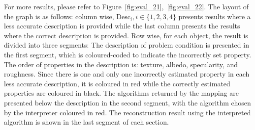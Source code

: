 For more results, please refer to Figure~\ref{fig:eval_21},~\ref{fig:eval_22}. The layout of the graph is as follows: column wise, $\text{Desc}_i, i\in\{1, 2, 3, 4\}$ presents results where a less accurate description is provided while the last column presents the results where the correct description is provided. Row wise, for each object, the result is divided into three segments: The description of problem condition is presented in the first segment, which is coloured-coded to indicate the incorrectly set property. The order of properties in the description is: texture, albedo, specularity, and roughness. Since there is one and only one incorrectly estimated property in each less accurate description, it is coloured in red while the correctly estimated properties are coloured in black. The algorithms returned by the mapping are presented below the description in the second segment, with the algorithm chosen by the interpreter coloured in red. The reconstruction result using the interpreted algorithm is shown in the last segment of each section.
